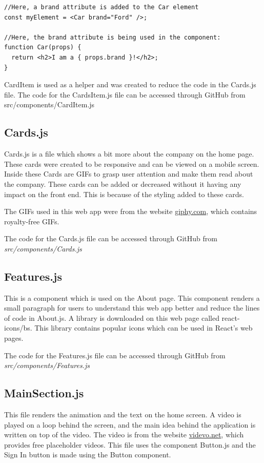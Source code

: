 \begin{lstlisting}
//Here, a brand attribute is added to the Car element
const myElement = <Car brand="Ford" />;

//Here, the brand attribute is being used in the component:
function Car(props) {
  return <h2>I am a { props.brand }!</h2>;
}
\end{lstlisting} \parencite{Reference32}

CardItem is used as a helper and was created to reduce the code in the Cards.js file. The code for the CardsItem.js file can be accessed through GitHub from src/components/CardItem.js

\subsection{Cards.js}
Cards.js is a file which shows a bit more about the company on the home page. These cards were created to be responsive and can be viewed on a mobile screen. Inside these Cards are GIFs to grasp user attention and make them read about the company. These cards can be added or decreased without it having any impact on the front end. This is because of the styling added to these cards. 

The GIFs used in this web app were from the website \href{https://giphy.com/explore/royalty-free}{giphy.com}, which contains royalty-free GIFs.

The code for the Cards.js file can be accessed through GitHub from \newline \textit{src/components/Cards.js}

\subsection{Features.js}
This is a component which is used on the About page. This component renders a small paragraph for users to understand this web app better and reduce the lines of code in About.js. A library is downloaded on this web page called react-icons/bs. This library contains popular icons which can be used in React's web pages.

The code for the Features.js file can be accessed through GitHub from \newline \textit{src/components/Features.js}

\subsection{MainSection.js}
This file renders the animation and the text on the home screen. A video is played on a loop behind the screen, and the main idea behind the application is written on top of the video. The video is from the website \href{https://www.videvo.net/stock-video-footage/placeholder/}{videvo.net}, which provides free placeholder videos. This file uses the component Button.js and the Sign In button is made using the Button component.

